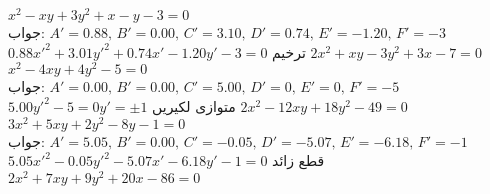 $x^2-xy+3y^2+x-y-3=0$\\
جواب:\quad
$A'=0.88,\, B'=0.00,\, C'=3.10,\, D'=0.74,\, E'=-1.20,\, F'=-3$ \\
$0.88x'^2+3.01y'^2+0.74x'-1.20y'-3=0$\quad
ترخیم
$2x^2+xy-3y^2+3x-7=0$
$x^2-4xy+4y^2-5=0$\\
جواب:\quad
$A'=0.00,\, B'=0.00,\, C'=5.00,\, D'=0,\, E'=0,\, F'=-5$\\
 $5.00y'^2-5=0$\quad {}\quad $y'=\pm 1$\quad 
متوازی لکیریں
$2x^2-12xy+18y^2-49=0$
$3x^2+5xy+2y^2-8y-1=0$\\
جواب:\quad
$A'=5.05,\, B'=0.00,\, C'=-0.05,\, D'=-5.07,\, E'=-6.18,\, F'=-1$\\
\quad $5.05x'^2-0.05y'^2-5.07x'-6.18y'-1=0$\quad
قطع زائد
$2x^2+7xy+9y^2+20x-86=0$

